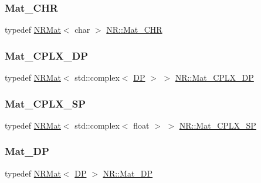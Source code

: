 \mbox{\label{namespaceNR_ad2f728fc5ba81ae9f08834b7d9efcb1d}} 
\subsubsection{\texorpdfstring{Mat\_CHR}{Mat\_CHR}}
{\footnotesize\ttfamily typedef \mbox{\hyperlink{classNR_1_1NRMat}{N\+R\+Mat}}$<$ char $>$ \mbox{\hyperlink{namespaceNR_ad2f728fc5ba81ae9f08834b7d9efcb1d}{N\+R\+::\+Mat\+\_\+\+C\+HR}}}

\mbox{\label{namespaceNR_a83c1447a6eed5061ad16601934856a19}} 
\subsubsection{\texorpdfstring{Mat\_CPLX\_DP}{Mat\_CPLX\_DP}}
{\footnotesize\ttfamily typedef \mbox{\hyperlink{classNR_1_1NRMat}{N\+R\+Mat}}$<$ std\+::complex$<$ \mbox{\hyperlink{namespaceNR_af6ff762dd605ff477b8e52387253a02a}{DP}} $>$ $>$ \mbox{\hyperlink{namespaceNR_a83c1447a6eed5061ad16601934856a19}{N\+R\+::\+Mat\+\_\+\+C\+P\+L\+X\+\_\+\+DP}}}

\mbox{\label{namespaceNR_accbf3fece80df76410b863e2cb7d2567}} 
\subsubsection{\texorpdfstring{Mat\_CPLX\_SP}{Mat\_CPLX\_SP}}
{\footnotesize\ttfamily typedef \mbox{\hyperlink{classNR_1_1NRMat}{N\+R\+Mat}}$<$ std\+::complex$<$ float $>$ $>$ \mbox{\hyperlink{namespaceNR_accbf3fece80df76410b863e2cb7d2567}{N\+R\+::\+Mat\+\_\+\+C\+P\+L\+X\+\_\+\+SP}}}

\mbox{\label{namespaceNR_afeedcf8f11ce39a2c83aefe0253cbbda}} 
\subsubsection{\texorpdfstring{Mat\_DP}{Mat\_DP}}
{\footnotesize\ttfamily typedef \mbox{\hyperlink{classNR_1_1NRMat}{N\+R\+Mat}}$<$ \mbox{\hyperlink{namespaceNR_af6ff762dd605ff477b8e52387253a02a}{DP}} $>$ \mbox{\hyperlink{namespaceNR_afeedcf8f11ce39a2c83aefe0253cbbda}{N\+R\+::\+Mat\+\_\+\+DP}}}

